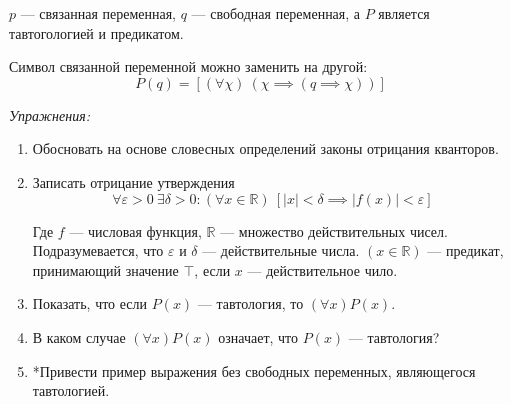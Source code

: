 $p$ --- связанная переменная, $q$ --- свободная переменная, а
$P$ является тавтогологией и предикатом.

Символ связанной переменной можно заменить на другой:
\[
	P(q)=[(\forall \chi)~(\chi\implies (q\implies \chi))]
\]

{\it Упражнения:}
\begin{enumerate}
	\item{}Обосновать на основе словесных определений законы отрицания
	кванторов\label{ex:quantor_neg_def}.
	\item{}Записать отрицание утверждения
	\[
		\forall \varepsilon>0~\exists \delta>0:
		(\forall x\in\mathbb{R})~[|x|<\delta\implies |f(x)|<\varepsilon]
	\]

	Где $f$ --- числовая функция, $\mathbb{R}$ --- множество действительных чисел.
	Подразумевается, что $\varepsilon$ и $\delta$ --- действительные числа.
	${(x\in\mathbb{R})}$ --- предикат, принимающий значение $\top$,
	если $x$ --- действительное чило.

	\item{}Показать, что если $P(x)$ --- тавтология, то $(\forall x)P(x)$.

	\item{}В каком случае $(\forall x)P(x)$ означает, что $P(x)$ --- тавтология?

	\item{}*Привести пример выражения без свободных переменных,
	являющегося тавтологией.
\end{enumerate}
